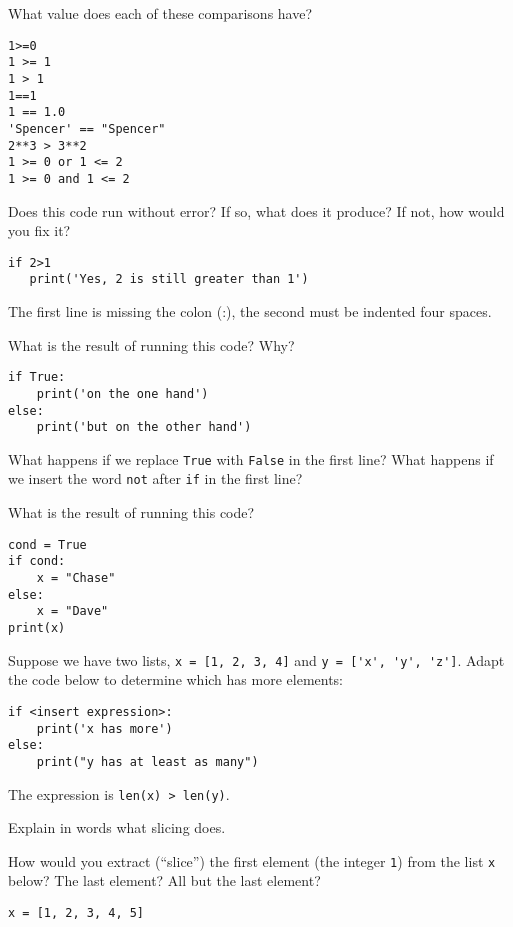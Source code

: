\documentclass[11pt]{exam}
\begin{document}
\begin{questions}
\item What value does each of these comparisons have?
\begin{verbatim}
1>=0
1 >= 1
1 > 1
1==1
1 == 1.0
'Spencer' == "Spencer"
2**3 > 3**2
1 >= 0 or 1 <= 2
1 >= 0 and 1 <= 2
\end{verbatim}

\item  Does this code run without error?  If so, what does it produce?  If not, how would you fix it?
\begin{verbatim}
if 2>1
   print('Yes, 2 is still greater than 1')
\end{verbatim}

\begin{solution}
The first line is missing the colon (:), the second must be indented four spaces.
\end{solution}

\item What is the result of running this code?  Why?
\begin{verbatim}
if True:
    print('on the one hand')
else:
    print('but on the other hand')
\end{verbatim}
What happens if we replace {\tt True} with {\tt False} in the first line?
What happens if we insert the word {\tt not} after {\tt if} in the first line?

\item What is the result of running this code?
\begin{verbatim}
cond = True
if cond:
    x = "Chase"
else:
    x = "Dave"
print(x)
\end{verbatim}

\item Suppose we have two lists,
{\tt x = [1, 2, 3, 4]} and \verb|y = ['x', 'y', 'z']|.
Adapt the code below to determine which has more elements:
\begin{verbatim}
if <insert expression>:
    print('x has more')
else:
    print("y has at least as many")
\end{verbatim}

\begin{solution}
The expression is \verb|len(x) > len(y)|.
\end{solution}


\item Explain in words what slicing does.

\item How would you extract (``slice'') the first element (the integer {\tt 1}) from the list {\tt x} below?
The last element?  All but the last element?
\begin{verbatim}
x = [1, 2, 3, 4, 5]
\end{verbatim}


\end{questions}
\end{document}
